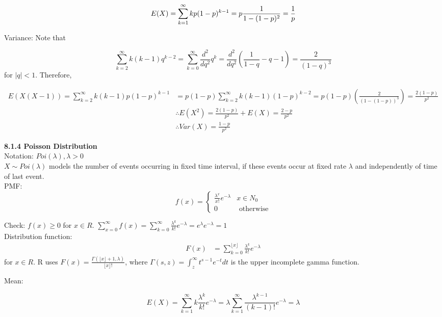 \documentclass[10pt,letterpaper]{article}
\begin{document}
						$$E(X)=\sum_{k=1}^{\infty}kp(1-p)^{k-1}
						=p\frac{1}{1-(1-p)^2}\\
						=\frac{1}{p}$$
					
    Variance: Note that
            
						$$\sum_{k=2}^{\infty}k(k-1)q^{k-2}=\sum_{k=0}^{\infty}\frac{d^2}{dq^2}q^k
						=\frac{d^2}{dq^2}(\frac{1}{1-q}-q-1)
						=\frac{2}{(1-q)^3}$$
					for $|q|<1$. Therefore,
					
					  \begin{align*}
						E(X(X-1))=\sum_{k=2}^{\infty}k(k-1)p(1-p)^{k-1}
						&=p(1-p)\sum_{k=2}^{\infty}k(k-1)(1-p)^{k-2}
						=p(1-p)(\frac{2}{(1-(1-p))^3})
						=\frac{2(1-p)}{p^2}\\
						&\therefore E(X^2)=\frac{2(1-p)}{p^2}+E(X)=\frac{2-p}{p^2}\\
						&\therefore Var(X)=\frac{1-p}{p^2}
						\end{align*}
\pagebreak

\textbf{8.1.4 Poisson Distribution}\\

    Notation: $Poi(\lambda), \lambda>0$\\

    $X\sim Poi(\lambda)$ models the number of events occurring in fixed time interval, if these events occur at fixed rate $\lambda$ and independently of time of last event.\\
    
    PMF: \[f(x)=\begin{cases}
					\frac{\lambda^x}{x!}e^{-\lambda}&x\in N_0\\
					0&\mbox{ otherwise}
					\end{cases}\]
					
		Check: $f(x)\geq0$ for $x\in R$. $\sum_{x=0}^{\infty}f(x)=\sum_{k=0}^{\infty}\frac{\lambda^k}{k!}e^{-\lambda}=e^{\lambda}e^{-\lambda}=1$\\
			
    Distribution function:
					\begin{align*}
						F(x)&=\sum_{k=0}^{\lfloor x\rfloor}\frac{\lambda^k}{k!}e^{-\lambda}
					\end{align*}
					for $x\in R$. R uses $F(x)=\frac{\Gamma(\lfloor x\rfloor+1, \lambda)}{\lfloor x\rfloor!}$, where $\Gamma(s, z)=\int_{z}^{\infty}t^{s-1}e^{-t}dt$ is the upper incomplete gamma function.

    Mean:
					
						$$E(X)=\sum_{k=1}^{\infty}k\frac{\lambda^k}{k!}e^{-\lambda}
						=\lambda\sum_{k=1}^{\infty}\frac{\lambda^{k-1}}{(k-1)!}e^{-\lambda}
						=\lambda$$
\end{document}
